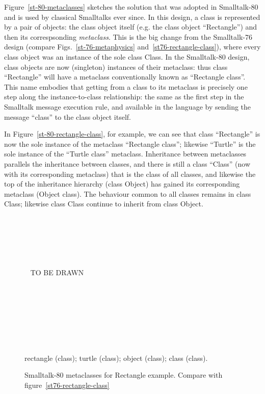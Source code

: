 Figure~\ref{st-80-metaclasses} sketches the solution that was adopted in
Smalltalk-80 and is used by classical Smalltalks ever since. In this
design, a class is represented by a pair of objects: the class object
itself (e.g. the class object ``\textsf{Rectangle}'') and then its
correspsonding \textit{metaclass}.
This is the big change from the
Smalltalk-76 design (compare Figs.~\ref{st-76-metaphysics}
and~\ref{st76-rectangle-class}), where every class object was an
instance of the sole class \textsf{Class}.
In the Smalltalk-80 design, class objects are
now (singleton) instances of their metaclass: thus class
``\textsf{Rectangle}'' will have a metaclass conventionally known as
``\textsf{Rectangle class}''.
This name embodies that getting from a
class to its metaclass is precisely one step along the
instance-to-class relationship: the same as the first step in the
Smalltalk message execution rule, and available in the language by
sending the message ``\textsf{class}'' to the class object itself.

In Figure~\ref{st-80-rectangle-class}, for example, we can see that class
``\textsf{Rectangle}'' is now the sole instance of the metaclass
``\textsf{Rectangle class}''; likewise ``\textsf{Turtle}'' is the
sole instance of the ``\textsf{Turtle class}'' metaclass.
Inheritance between metaclasses parallels the inheritance between
classes, and there is still a class ``\textsf{Class}'' (now with its
corresponding metaclass) that is the class of all classes, and
likewise the top of the inheritance hierarchy (class \textsf{Object})
has gained its corresponding metaclass (\textsf{Object class}).  The
behaviour common to all classes remains in class \textsf{Class};
likewise class \textsf{Class} continue to inherit from class
\textsf{Object}.

\begin{figure}[htb]
\begin{center}
 
  ~

  ~

  ~

  ~   TO BE DRAWN

  ~

  ~

  ~

  ~

  rectangle (class); turtle (class); object (class); class (class).
  
\end{center}
\caption{Smalltalk-80 metaclasses for Rectangle example. Compare with
  figure~\ref{st76-rectangle-class}}
\label{st80-rectangle-class}
\end{figure}



